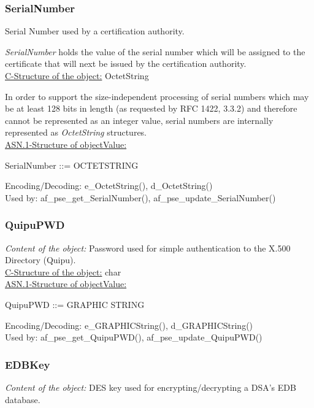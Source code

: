 \subsubsection{SerialNumber}
Serial Number used by a certification authority.
 
{\em SerialNumber} holds the value of the serial number which will be assigned to the certificate 
that will next be issued by the certification authority. \\

\underline{C-Structure of the object:} OctetString

In order to support the size-independent processing of serial numbers
which may be at least 128 bits in length (as requested by RFC 1422, 3.3.2) and therefore cannot
be represented as an integer value, serial numbers are internally represented as {\em OctetString} structures. \\

\underline{ASN.1-Structure of objectValue:}

{\small
\bvtab
\3 SerialNumber ::= \4 OCTETSTRING     \\
\evtab
}

Encoding/Decoding: e\_OctetString(), d\_OctetString() \\
Used by: af\_pse\_get\_SerialNumber(), af\_pse\_update\_SerialNumber()


\subsubsection{QuipuPWD}
{\em Content of the object:} Password used for simple authentication to the X.500 Directory (Quipu). \\

\underline{C-Structure of the object:} char \\


\underline{ASN.1-Structure of objectValue:}

{\small
\bvtab
\3 QuipuPWD ::= \4 GRAPHIC STRING     \\
\evtab
}

Encoding/Decoding: e\_GRAPHICString(), d\_GRAPHICString() \\
Used by: af\_pse\_get\_QuipuPWD(), af\_pse\_update\_QuipuPWD()


\subsubsection{EDBKey}
{\em Content of the object:} DES key used for encrypting/decrypting a DSA's EDB database. \\

